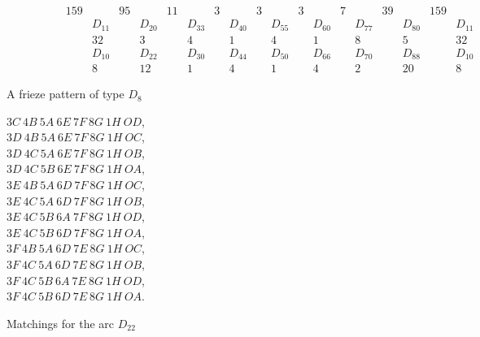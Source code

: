 \documentclass[a4paper]{amsart}
\begin{document}
\begin{figure}
\begin{center}
$$\begin{array}{cccccccccccccccccccccccc}
&      &      &      &      &      &159   &        &95    &        &11    &        &3     &        &3     &        &3     &        &7     &        &39    &        &159   & \\
&      &      &      &      &      &      &D_{11}&      &D_{20}&      &D_{33}&      &D_{40}&      &D_{55}&      &D_{60}&      &D_{77}&      &D_{80}&      &D_{11} \\
&      &      &      &      &      &      &32      &      &3       &      &4       &      &1       &      &4       &      &1       &      &8       &      &5       &      &32       \\
&      &      &      &      &      &      &D_{10}&      &D_{22}&      &D_{30}&      &D_{44}&      &D_{50}&      &D_{66}&      &D_{70}&      &D_{88}&      &D_{10} \\
&      &      &      &      &      &      &8       &      &12      &      &1       &      &4       &      &1       &      &4       &      &2       &      &20      &      &8         
\end{array}
$$
\end{center}
\caption{A frieze pattern of type $D_8$}
\label{D8examplefrieze}
\end{figure}

\begin{figure}
\begin{center}
\noindent
$3C\ 4B\ 5A\ 6E\ 7F\ 8G\ 1H\ OD$, \\
$3D\ 4B\ 5A\ 6E\ 7F\ 8G\ 1H\ OC$, \\
$3D\ 4C\ 5A\ 6E\ 7F\ 8G\ 1H\ OB$, \\
$3D\ 4C\ 5B\ 6E\ 7F\ 8G\ 1H\ OA$, \\
$3E\ 4B\ 5A\ 6D\ 7F\ 8G\ 1H\ OC$, \\
$3E\ 4C\ 5A\ 6D\ 7F\ 8G\ 1H\ OB$, \\
$3E\ 4C\ 5B\ 6A\ 7F\ 8G\ 1H\ OD$, \\
$3E\ 4C\ 5B\ 6D\ 7F\ 8G\ 1H\ OA$, \\
$3F\ 4B\ 5A\ 6D\ 7E\ 8G\ 1H\ OC$, \\
$3F\ 4C\ 5A\ 6D\ 7E\ 8G\ 1H\ OB$, \\
$3F\ 4C\ 5B\ 6A\ 7E\ 8G\ 1H\ OD$, \\
$3F\ 4C\ 5B\ 6D\ 7E\ 8G\ 1H\ OA$.
\end{center}
\caption{Matchings for the arc $D_{22}$}
\label{D8examplematchings}
\end{figure}
\end{document}
